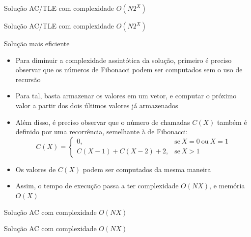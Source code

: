 \begin{frame}[fragile]{Solução AC/TLE com complexidade $O(N2^X)$}
\end{frame}

\begin{frame}[fragile]{Solução AC/TLE com complexidade $O(N2^X)$}
\end{frame}

\begin{frame}[fragile]{Solução mais eficiente}

    \begin{itemize}
        \item Para diminuir a complexidade assintótica da solução, primeiro é preciso
            observar que os números de Fibonacci podem ser computados sem o uso de recursão

        \item Para tal, basta armazenar os valores em um vetor, e computar o próximo valor
            a partir dos dois últimos valores já armazenados

        \item Além disso, é preciso observar que o número de chamadas $C(X)$ também é definido
            por uma recorrência, semelhante à de Fibonacci:
        \[
            C(X) = \left\lbrace \begin{array}{ll} 0, & \mbox{se}\, X = 0\ \mbox{ou}\ X = 1\\ C(X - 1) + C(X - 2) + 2, & \mbox{se}\, X > 1 \end{array}\right.
        \]

        \item Os valores de $C(X)$ podem ser computados da mesma maneira

        \item Assim, o tempo de execução passa a ter complexidade $O(NX)$, e memória $O(X)$
    \end{itemize}

\end{frame}

\begin{frame}[fragile]{Solução AC com complexidade $O(NX)$}
\end{frame}

\begin{frame}[fragile]{Solução AC com complexidade $O(NX)$}
\end{frame}
